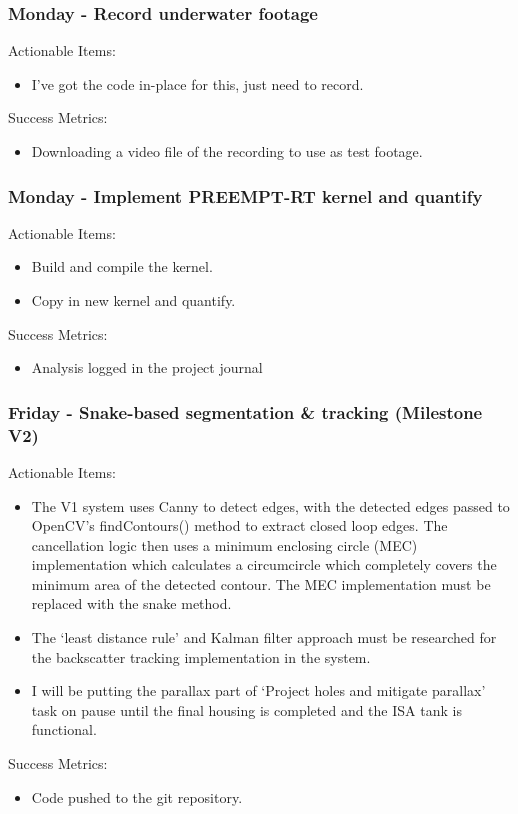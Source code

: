 \subsubsection{Monday - Record underwater footage}

Actionable Items:

\begin{itemize}
    \item I've got the code in-place for this, just need to record.
\end{itemize}

Success Metrics:

\begin{itemize}
    \item Downloading a video file of the recording to use as test footage.
\end{itemize}




\subsubsection{Monday - Implement PREEMPT-RT kernel and quantify}

Actionable Items:

\begin{itemize}
    \item Build and compile the kernel.
    \item Copy in new kernel and quantify.
\end{itemize}

Success Metrics:

\begin{itemize}
    \item Analysis logged in the project journal
\end{itemize}






\subsubsection{Friday - Snake-based segmentation \& tracking (Milestone V2)}

Actionable Items:

\begin{itemize}
    \item The V1 system uses Canny to detect edges, with the detected edges passed to OpenCV's findContours() method to extract closed loop edges. The cancellation logic then uses a minimum enclosing circle (MEC) implementation which calculates a circumcircle which completely covers the minimum area of the detected contour. The MEC implementation must be replaced with the snake method.
    \item The `least distance rule' and Kalman filter approach must be researched for the backscatter tracking implementation in the system.
    \item I will be putting the parallax part of `Project holes and mitigate parallax' task on pause until the final housing is completed and the ISA tank is functional.
\end{itemize}

Success Metrics:

\begin{itemize}
    \item Code pushed to the git repository.
\end{itemize}
